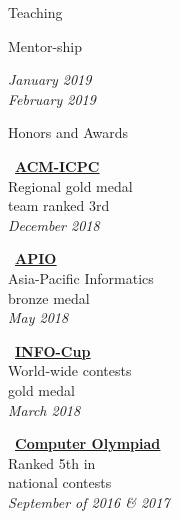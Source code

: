 \documentclass{resume} %
\begin{document}
\begin{rSection}{Teaching}
\begin{rSubsection}{Mentor-ship}{}{}{}
\begin{small}
\end{small}
\hfill 
\parbox{3cm}{\begin{flushright}
\begin{center}
\textcolor{Black!70}{\it January 2019 \\ February 2019}
\end{center}
\end{flushright}}
\end{rSubsection}
\end{rSection}

\begin{rSection}{Honors and Awards}
\begin{footnotesize}
\begin{minipage}[t]{1.6in}
\begin{center}
\vspace{0.2cm}
    \faLink \ \href{http://icpc.sharif.edu/2018/scoreboard/}{\bf \underline{ACM-ICPC}}\\
    Regional gold medal\\
    team ranked 3rd\\
    \textcolor{Black!70}{\it December 2018}
\end{center}
\end{minipage}
\hspace{0.1cm}
\begin{minipage}[t]{1.6in}
\begin{center}
\vspace{0.2cm}
\faLink \ \href{https://apio2018.ru/results/official-contest/}{\bf \underline{APIO}}\\
Asia-Pacific Informatics\\
bronze medal \\
\textcolor{Black!70}{\it May 2018}
\end{center}
\end{minipage}
\hspace{0.1cm}
\begin{minipage}[t]{1.6in}
\begin{center}
\vspace{0.2cm}
\faLink \ \href{https://www.info1cup.com/archive/2018/International_Round_Ranking.pdf}{\bf \underline{INFO-Cup}} \\
World-wide contests\\
gold medal\\
\textcolor{Black!70}{\it March 2018}
\end{center}
\end{minipage}
\hspace{0.1cm}
\begin{minipage}[t]{1.9in}
\begin{center}
\vspace{0.2cm}
\faLink \ {\bf \href{https://ioinformatics.org/journal/v11si_2017_25_33.pdf}{\underline{Computer Olympiad}}} \\
Ranked 5th in\\
national contests\\
\textcolor{Black!70}{\it September of 2016 \& 2017}
\end{center}
\end{minipage}
\end{footnotesize}
\end{rSection}
\end{document}
